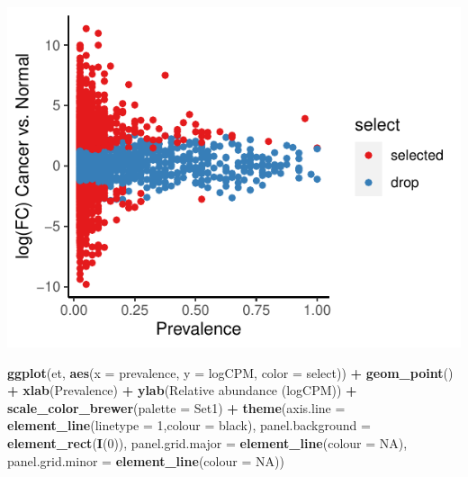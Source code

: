 \documentclass[
]{article}
\newenvironment{Shaded}{\begin{snugshade}}{\end{snugshade}}
\newcommand{\AttributeTok}[1]{\textcolor[rgb]{0.13,0.29,0.53}{#1}}
\newcommand{\ConstantTok}[1]{\textcolor[rgb]{0.56,0.35,0.01}{#1}}
\newcommand{\DecValTok}[1]{\textcolor[rgb]{0.00,0.00,0.81}{#1}}
\newcommand{\FunctionTok}[1]{\textcolor[rgb]{0.13,0.29,0.53}{\textbf{#1}}}
\newcommand{\NormalTok}[1]{#1}
\newcommand{\SpecialCharTok}[1]{\textcolor[rgb]{0.81,0.36,0.00}{\textbf{#1}}}
\newcommand{\StringTok}[1]{\textcolor[rgb]{0.31,0.60,0.02}{#1}}
\begin{document}
\includegraphics{workshop_files/figure-latex/unnamed-chunk-51-3.pdf}

\begin{Shaded}
\begin{Highlighting}[]

\FunctionTok{ggplot}\NormalTok{(et, }\FunctionTok{aes}\NormalTok{(}\AttributeTok{x =}\NormalTok{ prevalence, }\AttributeTok{y =}\NormalTok{ logCPM, }\AttributeTok{color =}\NormalTok{ select)) }\SpecialCharTok{+} \FunctionTok{geom\_point}\NormalTok{() }\SpecialCharTok{+}
  \FunctionTok{xlab}\NormalTok{(}\StringTok{\textquotesingle{}Prevalence\textquotesingle{}}\NormalTok{) }\SpecialCharTok{+} \FunctionTok{ylab}\NormalTok{(}\StringTok{\textquotesingle{}Relative abundance (logCPM)\textquotesingle{}}\NormalTok{) }\SpecialCharTok{+} 
  \FunctionTok{scale\_color\_brewer}\NormalTok{(}\AttributeTok{palette =} \StringTok{\textquotesingle{}Set1\textquotesingle{}}\NormalTok{) }\SpecialCharTok{+}
  \FunctionTok{theme}\NormalTok{(}\AttributeTok{axis.line =} \FunctionTok{element\_line}\NormalTok{(}\AttributeTok{linetype =} \DecValTok{1}\NormalTok{,}\AttributeTok{colour =} \StringTok{\textquotesingle{}black\textquotesingle{}}\NormalTok{),}
        \AttributeTok{panel.background =} \FunctionTok{element\_rect}\NormalTok{(}\FunctionTok{I}\NormalTok{(}\DecValTok{0}\NormalTok{)),}
        \AttributeTok{panel.grid.major =} \FunctionTok{element\_line}\NormalTok{(}\AttributeTok{colour =} \ConstantTok{NA}\NormalTok{),}
        \AttributeTok{panel.grid.minor =} \FunctionTok{element\_line}\NormalTok{(}\AttributeTok{colour =} \ConstantTok{NA}\NormalTok{))}
\end{Highlighting}
\end{Shaded}
\end{document}
